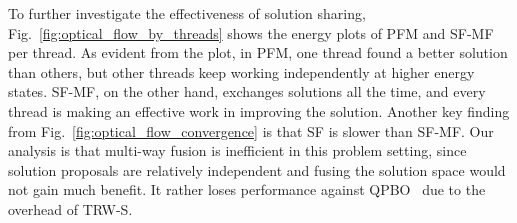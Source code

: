 % 
%
To further investigate the effectiveness of solution sharing,
Fig.~\ref{fig:optical_flow_by_threads} shows the energy plots of PFM
and SF-MF per thread. As evident from the plot, in PFM, one thread found
a better solution than others, but other threads keep working
independently at higher energy states. SF-MF, on the other hand,
exchanges solutions all the time, and every thread is making an effective
work in improving the solution.
Another key finding from Fig.~\ref{fig:optical_flow_convergence} is that
SF is slower than SF-MF. Our analysis is that multi-way fusion is
inefficient in this problem setting, since solution proposals are
relatively independent and fusing the solution space would not gain much
benefit. It rather loses performance against QPBO~\cite{QPBO} due to the
overhead of TRW-S.

